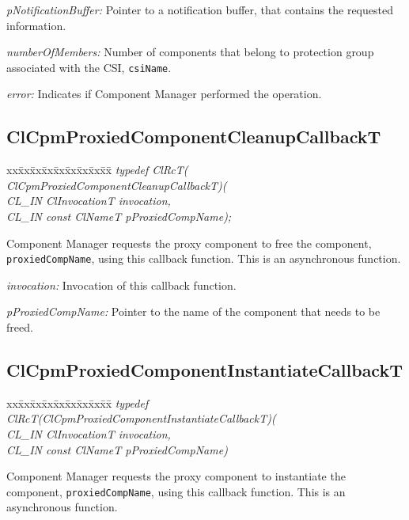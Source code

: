 {{\em p\-Notification\-Buffer:} Pointer to a notification buffer, that contains the requested information.

{\em number\-Of\-Members:} Number of components that belong to protection group associated with the CSI, {\tt{csi\-Name}}.

{\em error:} Indicates if Component Manager performed the operation. 



\subsection{ClCpmProxiedComponentCleanupCallbackT}
\begin{tabbing}
xx\=xx\=xx\=xx\=xx\=xx\=xx\=xx\=xx\=\kill
\textit{typedef ClRcT( ClCpmProxiedComponentCleanupCallbackT)(}\\
\>\>\>\>\textit{CL\_IN ClInvocationT invocation, }\\
\>\>\>\>\textit{CL\_IN const ClNameT pProxiedCompName);}\\
\end{tabbing}

Component Manager requests the proxy component to free the component, {\tt{proxied\-Comp\-Name}}, using this callback function. This is an asynchronous 
function.

{\em invocation:} Invocation of this callback function.

{\em p\-Proxied\-Comp\-Name:} Pointer to the name of the component that needs to be freed. 


\subsection{ClCpmProxiedComponentInstantiateCallbackT}
\begin{tabbing}
xx\=xx\=xx\=xx\=xx\=xx\=xx\=xx\=xx\=\kill
\textit{typedef ClRcT(ClCpmProxiedComponentInstantiateCallbackT)(}\\
\>\>\>\>\textit{CL\_IN ClInvocationT invocation, }\\
\>\>\>\>\textit{CL\_IN const ClNameT pProxiedCompName)}\\
\end{tabbing}


Component Manager requests the proxy component to instantiate the component, {\tt{proxiedCompName}}, using this callback function. This is an 
asynchronous function.

}
